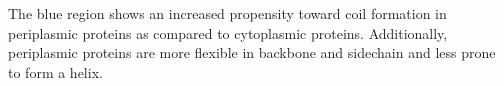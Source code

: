 The blue region shows an increased propensity toward coil formation in periplasmic proteins as compared to cytoplasmic proteins.
Additionally, periplasmic proteins are more flexible in backbone and sidechain and less prone to form a helix.
